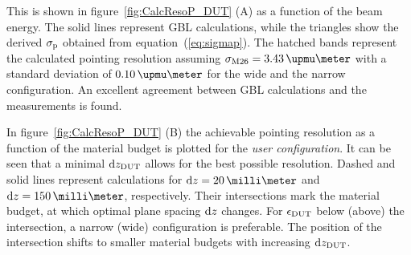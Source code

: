 \noindent
This is shown in figure~\ref{fig:CalcResoP_DUT} (A) as a function of the beam energy. 
The solid lines represent GBL calculations, while the triangles show the derived $\sigma_{\textrm{p}}$ obtained from equation~(\ref{eq:sigmap}). 
The hatched bands represent the calculated pointing resolution assuming $\sigmam = 3.43\,\upmu\meter$ with a standard deviation of $0.10\,\upmu\meter$ for the wide and the narrow configuration. 
An excellent agreement between GBL calculations and the measurements is found.

In figure~\ref{fig:CalcResoP_DUT} (B) the achievable pointing resolution as a function of the material budget is plotted for the \textit{user configuration}. 
It can be seen that a minimal $\textrm{d}z_{\textrm{DUT}}$ allows for the best possible resolution. 
Dashed and solid lines represent calculations for $\dz = 20\,\milli\meter$ and $\dz = 150\,\milli\meter$, respectively. 
Their intersections mark the material budget, at which optimal plane spacing $\textrm{d}z$ changes.
For $\mathnormal{\epsilon_{\textrm{DUT}}}$ below (above) the intersection, a narrow (wide) configuration is preferable. 
The position of the intersection shifts to smaller material budgets with increasing $\textrm{d}z_{\textrm{DUT}}$. 

